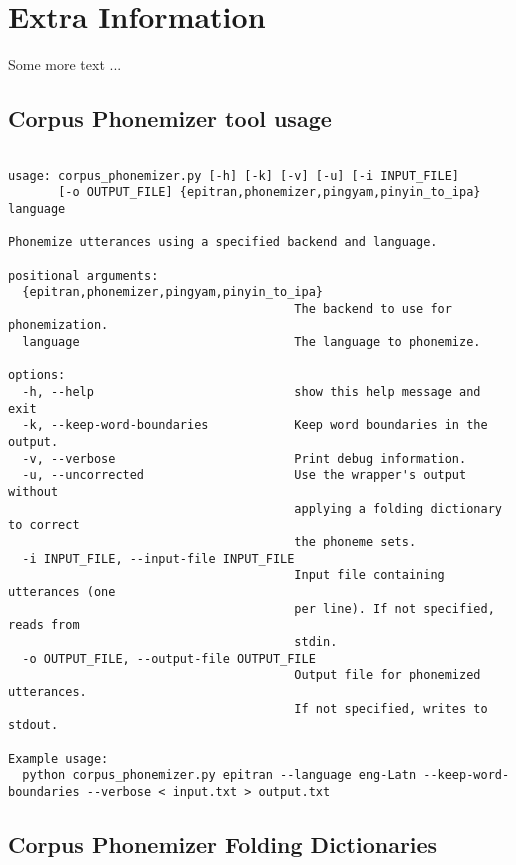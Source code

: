 \appendix
\chapter{Extra Information}
Some more text ...

\section{Corpus Phonemizer tool usage}
\label{appendix:corpus-phonemizer-usage}

\lstset{basicstyle=\small\ttfamily}
\begin{lstlisting}[float=tp, breaklines=true,caption={An extract taken from the help menu of \gpp, displaying the tool's usage.}]

usage: corpus_phonemizer.py [-h] [-k] [-v] [-u] [-i INPUT_FILE]
       [-o OUTPUT_FILE] {epitran,phonemizer,pingyam,pinyin_to_ipa} language

Phonemize utterances using a specified backend and language.

positional arguments:
  {epitran,phonemizer,pingyam,pinyin_to_ipa}
                                        The backend to use for phonemization.
  language                              The language to phonemize.

options:
  -h, --help                            show this help message and exit
  -k, --keep-word-boundaries            Keep word boundaries in the output.
  -v, --verbose                         Print debug information.
  -u, --uncorrected                     Use the wrapper's output without
                                        applying a folding dictionary to correct
                                        the phoneme sets.
  -i INPUT_FILE, --input-file INPUT_FILE
                                        Input file containing utterances (one
                                        per line). If not specified, reads from
                                        stdin.
  -o OUTPUT_FILE, --output-file OUTPUT_FILE
                                        Output file for phonemized utterances.
                                        If not specified, writes to stdout.

Example usage:
  python corpus_phonemizer.py epitran --language eng-Latn --keep-word-boundaries --verbose < input.txt > output.txt
\end{lstlisting}

\section{Corpus Phonemizer Folding Dictionaries}
\label{appendix:folding-dictionaries}
